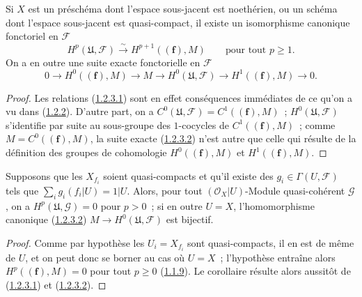\begin{proposition}[1.2.3]
\label{III.1.2.3-fr}
Si $X$ est un préschéma dont l'espace sous-jacent est noethérien, ou un
schéma dont l'espace sous-jacent est quasi-compact, il existe un isomorphisme
canonique fonctoriel en $\mathcal F$
\begin{equation}
\label{III.1.2.3.1-fr}
\tag{1.2.3.1}
H^p(\mathfrak U,\mathcal F)\xrightarrow{\sim}H^{p+1}((\mathbf f),M)
\qquad\text{pour tout }p\geq1.
\end{equation}
On a en outre une suite exacte fonctorielle en $\mathcal F$
\begin{equation}
\label{III.1.2.3.2-fr}
\tag{1.2.3.2}
0\longrightarrow H^0((\mathbf f),M)\longrightarrow M
\longrightarrow H^0(\mathfrak U,\mathcal F)
\longrightarrow H^1((\mathbf f),M)\longrightarrow0.
\end{equation}
\end{proposition}

\begin{proof}
Les relations (\hyperref[III.1.2.3.1-fr]{1.2.3.1}) sont en effet conséquences
immédiates de ce qu'on a vu dans (\hyperref[III.1.2.2-fr]{1.2.2}). D'autre
part, on a
$C^0(\mathfrak U,\mathcal F)=C^1((\mathbf f),M)$~;
$H^0(\mathfrak U,\mathcal F)$ s'identifie par suite au sous-groupe des
$1$-cocycles de $C^1((\mathbf f),M)$~; comme
$M=C^0((\mathbf f),M)$, la suite exacte
(\hyperref[III.1.2.3.2-fr]{1.2.3.2}) n'est autre que celle qui résulte de la
définition des groupes de cohomologie $H^0((\mathbf f),M)$ et
$H^1((\mathbf f),M)$.
\end{proof}

\begin{corollary}[1.2.4]
\label{III.1.2.4-fr}
Supposons que les $X_{f_i}$ soient quasi-compacts et qu'il existe des
$g_i\in\Gamma(U,\mathcal F)$ tels que
$\sum_i g_i(f_i\vert U)=1\vert U$. Alors, pour tout
$(\mathcal O_X\vert U)$-Module quasi-cohérent $\mathcal G$, on a
$H^p(\mathfrak U,\mathcal G)=0$ pour $p>0$~; si en outre $U=X$,
l'homomorphisme canonique \textup{(\hyperref[III.1.2.3.2-fr]{1.2.3.2})}
$M\to H^0(\mathfrak U,\mathcal F)$ est bijectif.
\end{corollary}

\begin{proof}
Comme par hypothèse les $U_i=X_{f_i}$ sont quasi-compacts, il en est de même
de $U$, et on peut donc se borner au cas où $U=X$~; l'hypothèse entraîne alors
$H^p((\mathbf f),M)=0$ pour tout $p\geq0$
(\hyperref[III.1.1.9-fr]{1.1.9}). Le corollaire résulte alors aussitôt de
(\hyperref[III.1.2.3.1-fr]{1.2.3.1}) et
(\hyperref[III.1.2.3.2-fr]{1.2.3.2}).
\end{proof}

